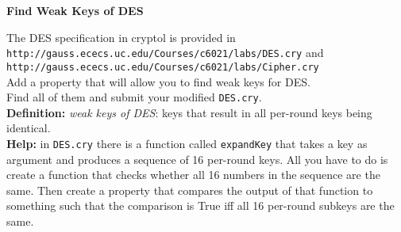 \documentclass[12pt]{article}
\begin{document}
\begin{center}
\end{center}
\vspace*{-1mm}
\centerline{\Large\bf \textcolor{title}{Find Weak Keys of DES}}
\vspace*{6mm}
The DES specification in cryptol is provided in\\
{\tt http://gauss.ececs.uc.edu/Courses/c6021/labs/DES.cry} and\\
{\tt http://gauss.ececs.uc.edu/Courses/c6021/labs/Cipher.cry}\\
Add a property that will allow you to find weak keys for DES.\\
Find all of them and submit your modified {\tt DES.cry}.\\

\noindent
{\bf Definition:} {\em weak keys of DES}: keys that result in all per-round
keys being identical.\\

\noindent
    {\bf Help:} in {\tt DES.cry} there is a function called {\tt expandKey} that
    takes a key as argument and produces a sequence of 16 per-round keys.  All
    you have to do is create a function that checks whether all 16 numbers
    in the sequence are the same.  Then create a property that compares the
    output of that function to something such that the comparison is True iff
    all 16 per-round subkeys are the same.

\vspace*{5mm}
\noindent
{}
\end{document}
